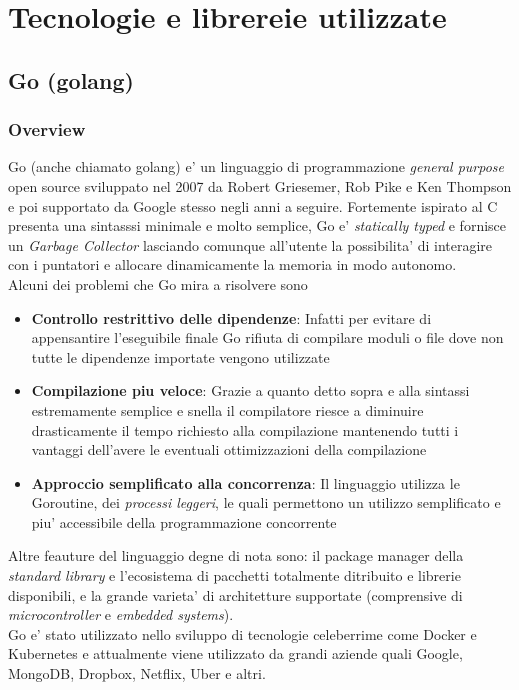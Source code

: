 \chapter{Tecnologie e librereie utilizzate}
\section{Go (golang)}
\subsection{Overview}
Go\cite{Go_Wikipedia} (anche chiamato {golang}) e' un linguaggio di programmazione \emph{general purpose} open source sviluppato nel 2007 da Robert Griesemer, Rob Pike e Ken Thompson e poi supportato da Google stesso negli anni a seguire. Fortemente ispirato al C presenta una sintasssi minimale e molto semplice, Go e' \emph{statically typed} e fornisce un \emph{Garbage Collector} lasciando comunque all'utente la possibilita' di interagire con i puntatori e allocare dinamicamente la memoria in modo autonomo.\\
Alcuni dei problemi che Go mira a risolvere sono
\begin{itemize}
    \item \textbf{Controllo restrittivo delle dipendenze}: Infatti per evitare di appensantire l'eseguibile finale Go rifiuta di compilare moduli o file dove non tutte le dipendenze importate vengono utilizzate
    \item \textbf{Compilazione piu veloce}: Grazie a quanto detto sopra e alla sintassi estremamente semplice e snella il compilatore riesce a diminuire drasticamente il tempo richiesto alla compilazione mantenendo tutti i vantaggi dell'avere le eventuali ottimizzazioni della compilazione
    \item \textbf{Approccio semplificato alla concorrenza}: Il linguaggio utilizza le Goroutine, dei \emph{processi leggeri}, le quali permettono un utilizzo semplificato e piu' accessibile della programmazione concorrente
\end{itemize}
Altre feauture del linguaggio degne di nota sono: il package manager della \emph{standard library} e l'ecosistema di pacchetti totalmente ditribuito e librerie disponibili, e la grande varieta' di architetture supportate (comprensive di \emph{microcontroller} e \emph{embedded systems}).\\
Go e' stato utilizzato nello sviluppo di tecnologie celeberrime come Docker e Kubernetes e attualmente viene utilizzato da grandi aziende quali Google, MongoDB, Dropbox, Netflix, Uber e altri.

